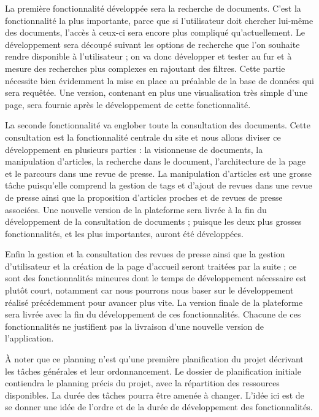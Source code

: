 	La première fonctionnalité développée sera la recherche de documents. C'est la fonctionnalité la plus importante, parce que si l'utilisateur doit chercher lui-même des documents, l'accès à ceux-ci sera encore plus compliqué qu'actuellement. Le développement sera découpé suivant les options de recherche que l'on souhaite rendre disponible à l'utilisateur ; on va donc développer et tester au fur et à mesure des recherches plus complexes en rajoutant des filtres. Cette partie nécessite bien évidemment la mise en place au préalable de la base de données qui sera requêtée. Une version, contenant en plus une visualisation très simple d'une page, sera fournie après le développement de cette fonctionnalité.

	La seconde fonctionnalité va englober toute la consultation des documents. Cette consultation est la fonctionnalité centrale du site et nous allons diviser ce développement en plusieurs parties : la visionneuse de documents, la manipulation d'articles, la recherche dans le document, l'architecture de la page et le parcours dans une revue de presse. La manipulation d'articles est une grosse tâche puisqu'elle comprend la gestion de tags et d'ajout de revues dans une revue de presse ainsi que la proposition d'articles proches et de revues de presse associées. Une nouvelle version de la plateforme sera livrée à la fin du développement de la consultation de documents ; puisque les deux plus grosses fonctionnalités, et les plus importantes, auront été développées.

	Enfin la gestion et la consultation des revues de presse ainsi que la gestion d'utilisateur et la création de la page d'accueil seront traitées par la suite ; ce sont des fonctionnalités mineures dont le temps de développement nécessaire est plutôt court, notamment car nous pourrons nous baser sur le développement réalisé précédemment pour avancer plus vite. La version finale de la plateforme sera livrée avec la fin du développement de ces fonctionnalités. Chacune de ces fonctionnalités ne justifient pas la livraison d'une nouvelle version de l'application.

	À noter que ce planning n'est qu'une première planification du projet décrivant les tâches générales et leur ordonnancement. Le dossier de planification initiale contiendra le planning précis du projet, avec la répartition des ressources disponibles. La durée des tâches pourra être amenée à changer. L'idée ici est de se donner une idée de l'ordre et de la durée de développement des fonctionnalités.

